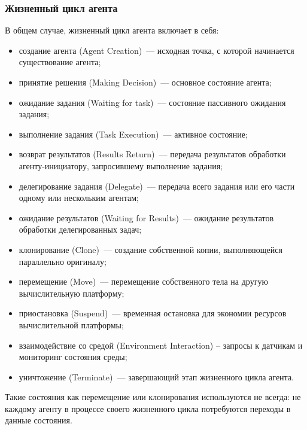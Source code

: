 \subsubsection{Жизненный цикл агента}
В общем случае, жизненный цикл агента включает в себя:
\begin{itemize}
\item создание агента (Agent Creation)~--- исходная точка, с которой начинается существование агента;
\item принятие решения (Making Decision)~--- основное состояние агента;
\item ожидание задания (Waiting for task)~--- состояние пассивного ожидания задания;
\item выполнение задания (Task Execution)~--- активное состояние;
\item возврат результатов (Results Return)~--- передача результатов обработки агенту-инициатору, запросившему выполнение задания;
\item делегирование задания (Delegate)~--- передача всего задания или его части одному или нескольким агентам;
\item ожидание результатов (Waiting for Results)~--- ожидание результатов обработки делегированных задач;
\item клонирование (Clone)~--- создание собственной копии, выполняющейся параллельно оригиналу;
\item перемещение (Move)~--- перемещение собственного тела на другую вычислительную платформу;
\item приостановка (Suspend)~--- временная остановка для экономии ресурсов вычислительной платформы;
\item взаимодействие со средой (Environment Interaction) – запросы к датчикам и мониторинг состояния среды;
\item уничтожение (Terminate)~--- завершающий этап жизненного цикла агента.
\end{itemize}

Такие состояния как перемещение или клонирования используются не всегда: не каждому агенту в процессе своего жизненного цикла потребуются переходы в данные состояния.

